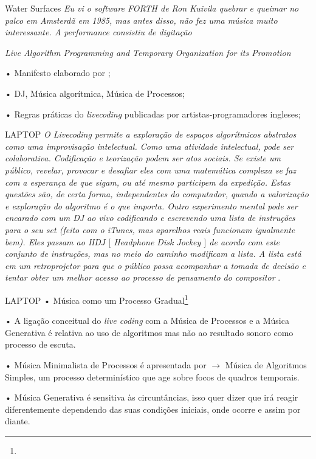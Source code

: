 \documentclass[aspectratio=169]{beamer}
\begin{document}
\begin{frame}{Water Surfaces}
\emph{Eu vi o \emph{software} FORTH de Ron Kuivila quebrar e queimar no palco em Amsterdã em 1985, mas antes disso, não fez uma música muito interessante. A performance consistiu de digitação}\cite{wang_historical_2005}
\end{frame}

\begin{frame}{\emph{Live Algorithm Programming and Temporary Organization for its Promotion}}

• Manifesto elaborado por ;

• DJ, Música algorítmica, Música de Processos;

• Regras práticas do \emph{livecoding} publicadas por artistas-programadores ingleses;
\end{frame}

\begin{frame}{LAPTOP}
\emph{O \emph{Livecoding} permite a exploração de espaços algorítmicos abstratos como uma improvisação intelectual. Como uma atividade intelectual, pode ser colaborativa. Codificação e teorização podem ser atos sociais. Se existe um público, revelar, provocar e desafiar eles com uma matemática complexa se faz com a esperança de que sigam, ou até mesmo participem da expedição. Estas questões são, de certa forma, independentes do computador, quando a valorização e exploração do algoritmo é o que importa. Outro experimento mental pode ser encarado com um DJ ao vivo codificando e escrevendo uma lista de instruções para o seu \emph{set} (feito com o iTunes, mas aparelhos reais funcionam igualmente bem). Eles passam ao HDJ $[$ \emph{Headphone Disk Jockey} $]$ de acordo com este conjunto de instruções, mas no meio do caminho modificam a lista. A lista está em um retroprojetor para que o público possa acompanhar a tomada de decisão e tentar obter um melhor acesso ao processo de pensamento do compositor} \cite[p.~245]{ward_live_2004}.
\end{frame}

\begin{frame}{LAPTOP}
• Música como um Processo Gradual\footnote{}

• A ligação conceitual do \emph{live coding} com a Música de Processos e a Música Generativa é relativa ao uso de algoritmos  mas não ao resultado sonoro como processo de escuta.

• Música Minimalista de Processos é apresentada por  $\rightarrow$ Música de Algoritmos Simples,  um processo determinístico que age sobre focos de quadros temporais. 

• Música Generativa é sensitiva às circuntâncias, isso quer dizer que irá reagir diferentemente dependendo das suas condições iniciais, onde ocorre e assim por diante.
\end{frame}
\end{document}
